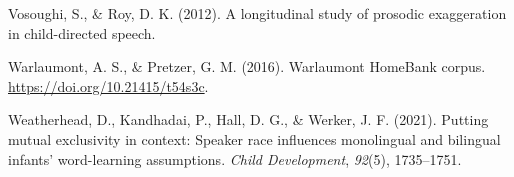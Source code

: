 \documentclass[10pt, letterpaper]{article}
\newenvironment{CSLReferences}%
  {}%
  {\par}
\begin{document}
\begin{CSLReferences}{1}{0}
\leavevmode\hypertarget{ref-vosoughi2012longitudinal}{}%
Vosoughi, S., \& Roy, D. K. (2012). A longitudinal study of prosodic
exaggeration in child-directed speech.

\leavevmode\hypertarget{ref-warlaumontcorpus}{}%
Warlaumont, A. S., \& Pretzer, G. M. (2016). Warlaumont HomeBank corpus.
\url{https://doi.org/10.21415/t54s3c}.

\leavevmode\hypertarget{ref-weatherhead2021putting}{}%
Weatherhead, D., Kandhadai, P., Hall, D. G., \& Werker, J. F. (2021).
Putting mutual exclusivity in context: Speaker race influences
monolingual and bilingual infants' word-learning assumptions.
\emph{Child Development}, \emph{92}(5), 1735--1751.

\end{CSLReferences}


\end{document}
